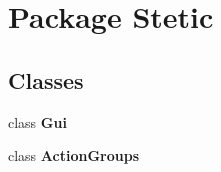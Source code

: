 \hypertarget{namespaceStetic}{\section{Package Stetic}
\label{namespaceStetic}
}
\subsection*{Classes}
\begin{DoxyCompactItemize}
\item 
class {\bfseries Gui}
\item 
class {\bfseries Action\-Groups}
\end{DoxyCompactItemize}
